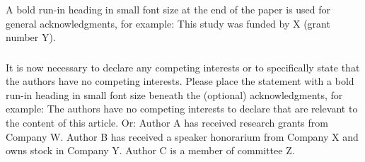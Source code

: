\documentclass[runningheads]{llncs}
\begin{document}
\begin{credits}
\subsubsection{\ackname} A bold run-in heading in small font size at the end of the paper is
used for general acknowledgments, for example: This study was funded
by X (grant number Y).

\subsubsection{\discintname}
It is now necessary to declare any competing interests or to specifically
state that the authors have no competing interests. Please place the
statement with a bold run-in heading in small font size beneath the
(optional) acknowledgments,
for example: The authors have no competing interests to declare that are
relevant to the content of this article. Or: Author A has received research
grants from Company W. Author B has received a speaker honorarium from
Company X and owns stock in Company Y. Author C is a member of committee Z.
\end{credits}
%
%
%


%




\end{document}
